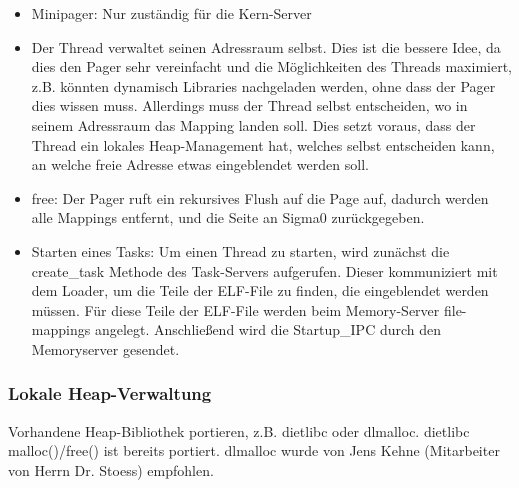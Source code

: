 \begin{itemize}
	\item Minipager: Nur zuständig für die Kern-Server
	
	\item Der Thread verwaltet seinen Adressraum selbst. Dies ist die bessere Idee, da dies den Pager sehr vereinfacht und die Möglichkeiten des Threads maximiert, z.B. könnten dynamisch Libraries nachgeladen werden, ohne dass der Pager dies wissen muss. Allerdings muss  der Thread selbst entscheiden, wo in seinem Adressraum das Mapping landen soll. Dies setzt voraus, dass der Thread ein lokales Heap-Management hat, welches selbst entscheiden kann, an welche freie Adresse etwas eingeblendet werden soll.
	
	\item free: Der Pager ruft ein rekursives Flush auf die Page auf, dadurch werden alle Mappings entfernt, und die Seite an Sigma0 zurückgegeben.
    \item Starten eines Tasks: Um einen Thread zu starten, wird zunächst
        die create\_task Methode des Task-Servers aufgerufen. Dieser
        kommuniziert mit dem Loader, um die Teile der ELF-File zu
        finden, die eingeblendet werden müssen. Für diese Teile der
        ELF-File werden beim Memory-Server file-mappings angelegt.
        Anschließend wird die Startup\_IPC durch den Memoryserver
        gesendet.
\end{itemize}

\subsubsection{Lokale Heap-Verwaltung}

Vorhandene Heap-Bibliothek portieren, z.B. dietlibc oder dlmalloc. dietlibc malloc()/free() ist bereits portiert. dlmalloc wurde von Jens Kehne (Mitarbeiter von Herrn Dr. Stoess) empfohlen.

